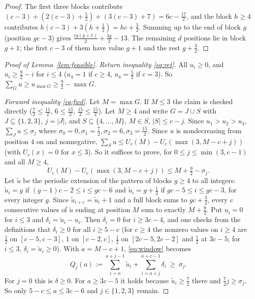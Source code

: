\documentclass[11pt]{article}
\theoremstyle{remark}
\begin{document}
\begin{proof}
The first three blocks contribute $(c-3)+(2(c-3)+\frac52)+(3(c-3)+7)=6c-\frac{17}2$, and the block $h\ge4$ contributes $h(c-3)+3(h+\frac12)=hc+\frac32$. Summing up to the end of block $g$ (position $gc-3$) gives $\frac{c g(g+1)}2+\frac{3g}2-13$. The remaining $d$ positions lie in block $g+1$; the first $c-3$ of them have value $g+1$ and the rest $g+\frac32$.
\end{proof}

\begin{proof}[Proof of Lemma~\ref{lem:feasible}]
\emph{Return inequality \eqref{eq:ret}.} All $u_i\ge0$, and $u_i\ge\frac92-i$ for $i\le4$ ($u_4=1$ if $c\ge4$, $u_4=\frac52$ if $c=3$). So $\sum_{G}u\ge u_{\max G}\ge\frac92-\max G$.

\emph{Forward inequality \eqref{eq:fwd}.} Let $M=\max G$. If $M\le3$ the claim is checked directly ($\frac72\le\frac{11}2$, $6\le\frac{13}2$, $\frac{15}2\le\frac{15}2$). Let $M\ge4$ and write $G=J\cup S$ with $J\subseteq\{1,2,3\}$, $j=|J|$, and $S\subseteq\{4,\dots,M\}$, $M\in S$, $|S|\le c-j$. Since $u_1>u_2>u_3$, $\sum_J u\le\sigma_j$ where $\sigma_0=0,\sigma_1=\frac72,\sigma_2=6,\sigma_3=\frac{15}2$. Since $u$ is nondecreasing from position $4$ on and nonnegative, $\sum_S u\le U_c(M)-U_c(\max(3,M-c+j))$ (with $U_c(x)=0$ for $x\le3$). So it suffices to prove, for $0\le j\le\min(3,c-1)$ and all $M\ge4$,
\begin{equation}\label{eq:window}
U_c(M)-U_c(\max(3,M-c+j))\le M+\tfrac92-\sigma_j .
\end{equation}
Let $\tilde u$ be the periodic extension of the pattern of blocks $g\ge4$ to all integers: $\tilde u_i=g$ if $(g-1)c-2\le i\le gc-6$ and $\tilde u_i=g+\frac12$ if $gc-5\le i\le gc-3$, for every integer $g$. Since $\tilde u_{i+c}=\tilde u_i+1$ and a full block sums to $gc+\frac32$, every $c$ consecutive values of $\tilde u$ ending at position $M$ sum to exactly $M+\frac92$. Put $u_i=0$ for $i\le3$ and $\delta_i=\tilde u_i-u_i$. Then $\delta_i=0$ for $i\ge3c-4$, and one checks from the definitions that $\delta_i\ge0$ for all $i\ge 5-c$ (for $c\ge4$ the nonzero values on $i\ge4$ are $\frac12$ on $[c-5,c-3]$, $1$ on $[c-2,c]$, $\frac12$ on $[2c-5,2c-2]$ and $\frac12$ at $3c-5$; for $i\le3$, $\delta_i=\tilde u_i\ge0$). With $a=M-c+1$, \eqref{eq:window} becomes
\begin{equation}\label{eq:Q}
Q_j(a):=\sum_{i=a}^{a+j-1}\tilde u_i+\sum_{i=a+j}^{a+c-1}\delta_i\ \ge\ \sigma_j .
\end{equation}
For $j=0$ this is $\delta\ge0$. For $a\ge 3c-5$ it holds because $\tilde u_i\ge\frac72$ there and $\frac72 j\ge\sigma_j$. So only $5-c\le a\le 3c-6$ and $j\in\{1,2,3\}$ remain.


\end{proof}
\end{document}
